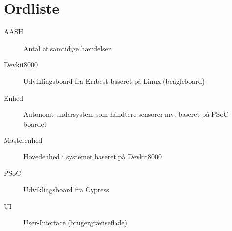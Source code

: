 \chapter{Ordliste}


\begin{description}

\item[AASH] Antal af samtidige hændelser
\item[Devkit8000] Udviklingsboard fra Embest baseret på Linux (beagleboard)
\item[Enhed] Autonomt undersystem som håndtere sensorer mv. baseret på PSoC boardet
\item[Masterenhed] Hovedenhed i systemet baseret på Devkit8000
\item[PSoC] Udviklingsboard fra Cypress
\item[UI] User-Interface (brugergrænseflade)

\end{description}